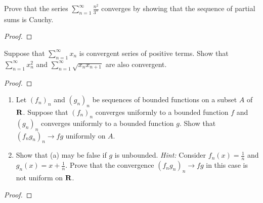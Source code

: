 \documentclass[11pt,twoside,openany]{memoir}
\begin{document}
\newpage
\fancyhead[L]{\scalebox{0.9}{Series}}
\fancyhead[R]{\scalebox{0.9}{Appeared on: S18}}
\begin{problem}
    Prove that the series $\sum_{n = 1}^\infty \frac{n^2}{3^n}$ converges by showing that the sequence of partial sums is Cauchy.
\end{problem}
\begin{proof}
\end{proof}

\newpage
\fancyhead[L]{\scalebox{0.9}{Series}}
\fancyhead[R]{\scalebox{0.9}{Appeared on: W22}}
\begin{problem}
    Suppose that $\sum_{n = 1}^\infty x_n$ is convergent series of positive terms. Show that $\sum_{n = 1}^\infty x_n^2$ and $\sum_{n = 1}^\infty \sqrt{x_n x_{n+1}}$ are also convergent.
\end{problem}
\begin{proof}
\end{proof}

\newpage
\fancyhead[L]{\scalebox{0.9}{Series}}
\fancyhead[R]{\scalebox{0.9}{Appeared on: --}}
\begin{problem}
    \phantom{a}
    \begin{enumerate}[label = (\arabic*)]
        \item Let $(f_n)_n$ and $(g_n)_n$ be sequences of bounded functions on a subset $A$ of $\mathbf{R}$. Suppose that $(f_n)_n$ converges uniformly to a bounded function $f$ and $(g_n)_n$ converges uniformly to a bounded function $g$. Show that $(f_n g_n)_n \rightarrow fg$ uniformly on $A$.
        \item Show that (a) may be false if $g$ is unbounded. \textit{Hint:} Consider $f_n(x) = \frac{1}{n}$ and $g_n(x) = x + \frac{1}{n}$. Prove that the convergence $(f_n g_n)_n \rightarrow fg$ in this case is not uniform on $\mathbf{R}$.
    \end{enumerate}
\end{problem}
\begin{proof}
\end{proof}
\end{document}
